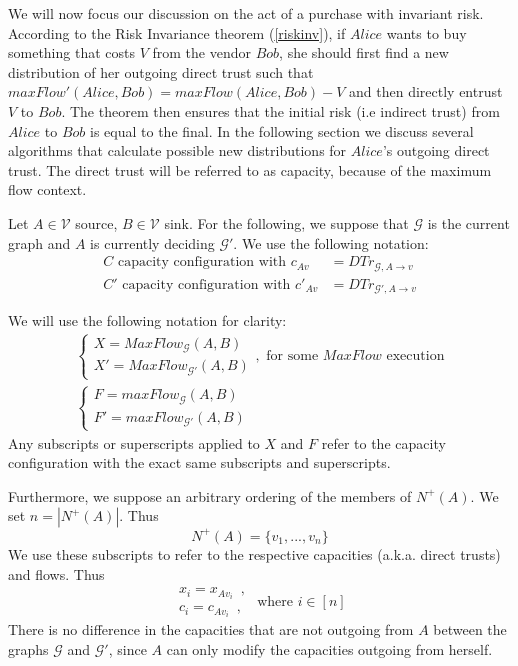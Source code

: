 We will now focus our discussion on the act of a purchase with invariant risk. According to the Risk Invariance theorem
(\ref{riskinv}), if $Alice$ wants to buy something that costs $V$ from the vendor $Bob$, she should first find a new
distribution of her outgoing direct trust such that $maxFlow'\left(Alice, Bob\right) = maxFlow\left(Alice, Bob\right) - V$ and
then directly entrust $V$ to $Bob$. The theorem then ensures that the initial risk (i.e indirect trust) from $Alice$ to $Bob$
is equal to the final. In the following section we discuss several algorithms that calculate possible new distributions for
$Alice$'s outgoing direct trust. The direct trust will be referred to as capacity, because of the maximum flow context.

Let $A \in \mathcal{V}$ source, $B \in \mathcal{V}$ sink. For the following, we suppose that $\mathcal{G}$ is the current
graph and $A$ is currently deciding $\mathcal{G}'$. We use the following notation:
\begin{align*}
  C \mbox{ capacity configuration with } c_{Av} &= DTr_{\mathcal{G}, A \rightarrow v} \\
  C' \mbox{ capacity configuration with } c'_{Av} &= DTr_{\mathcal{G}', A \rightarrow v}
\end{align*}

We will use the following notation for clarity:
\begin{equation*}
\begin{gathered}
  \begin{cases}
    X = MaxFlow_{\mathcal{G}}\left(A, B\right) \\
    X' = MaxFlow_{\mathcal{G}'}\left(A, B\right)
  \end{cases}, \mbox{ for some } MaxFlow \mbox{ execution} \\
  \begin{cases}
    F = maxFlow_{\mathcal{G}}\left(A, B\right) \\
    F' = maxFlow_{\mathcal{G}'}\left(A, B\right)
  \end{cases}
\end{gathered}
\end{equation*}
Any subscripts or superscripts applied to $X$ and $F$ refer to the capacity configuration with the exact same subscripts and
superscripts.

Furthermore, we suppose an arbitrary ordering of the members of $N^{+}\left(A\right)$. We set $n = |N^{+}\left(A\right)|$.
Thus
\begin{equation*}
  N^{+}\left(A\right) = \{v_1, ..., v_n\}
\end{equation*}
We use these subscripts to refer to the respective capacities (a.k.a. direct trusts) and flows. Thus
\begin{equation*}
  \begin{array}{l}
    x_i = x_{Av_i} \enspace, \\
    c_i = c_{Av_i} \enspace,
  \end{array}
  \mbox{ where } i \in [n]
\end{equation*}
There is no difference in the capacities that are not outgoing from $A$ between the graphs $\mathcal{G}$ and $\mathcal{G}'$,
since $A$ can only modify the capacities outgoing from herself.
